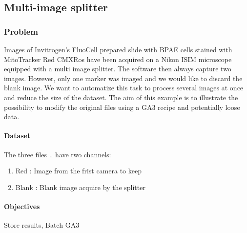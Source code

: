 \subsection{Multi-image splitter}

\subsubsection*{Problem}

Images of Invitrogen's FluoCell prepared slide with BPAE cells stained with MitoTracker Red CMXRos have been acquired on a Nikon ISIM microscope equipped with a multi image splitter. The software then always capture two images. However, only one marker was imaged and we would like to discard the blank image. We want to automatize this task to process several images at once and reduce the size of the dataset. The aim of this example is to illustrate the possibility to modify the original files using a GA3 recipe and potentially loose data.

\paragraph{Dataset} The three files  ..  have two channels:
    \begin{enumerate}
        \item Red : Image from the frist camera to keep
        \item Blank : Blank image acquire by the splitter
    \end{enumerate}

\paragraph{Objectives} 
Store results, 
Batch GA3

